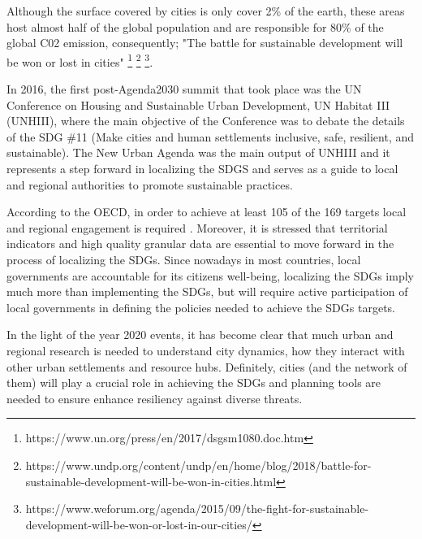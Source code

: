 Although the surface covered by cities is only cover 2\% of the earth, these areas host almost half of the global population and are responsible for 80\% of the global C02 emission, consequently; "The battle for sustainable development will be won or lost in cities" \footnote{https://www.un.org/press/en/2017/dsgsm1080.doc.htm} \footnote{https://www.undp.org/content/undp/en/home/blog/2018/battle-for-sustainable-development-will-be-won-in-cities.html} \footnote{https://www.weforum.org/agenda/2015/09/the-fight-for-sustainable-development-will-be-won-or-lost-in-our-cities/}.  \par
In 2016, the first post-Agenda2030 summit that took place was the UN Conference on Housing and Sustainable Urban Development, UN Habitat III (UNHIII), where the main objective of the Conference was to debate the details of the SDG \#11 (Make cities and human settlements inclusive, safe, resilient, and sustainable). The New Urban Agenda was the main output of UNHIII and it represents a step forward in localizing the SDGS and serves as a guide to local and regional authorities to promote sustainable practices.  \par
According to the OECD, in order to achieve at least 105 of the 169 targets local and regional engagement is required \parencite{EuropeanCommission2018, OECD2020}. Moreover, it is stressed that territorial indicators and high quality granular data are essential to move forward in the process of localizing the SDGs. Since nowadays in most countries, local governments are accountable for its citizens well-being, localizing the SDGs imply much more than implementing the SDGs, but will require active participation of local governments in defining the policies needed to achieve the SDGs targets. \par
In the light of the year 2020 events, it has become clear that much urban and regional research is needed to understand city dynamics, how they interact with other urban settlements and resource hubs. Definitely, cities (and the network of them) will play a crucial role in achieving the SDGs and planning tools are needed to ensure enhance resiliency against diverse threats.   



